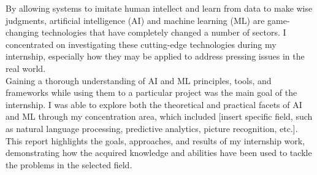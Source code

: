 By allowing systems to imitate human intellect and learn from data to make wise judgments, artificial intelligence (AI) and machine learning (ML) are game-changing technologies that have completely changed a number of sectors. I concentrated on investigating these cutting-edge technologies during my internship, especially how they may be applied to address pressing issues in the real world.\\
Gaining a thorough understanding of AI and ML principles, tools, and frameworks while using them to a particular project was the main goal of the internship. I was able to explore both the theoretical and practical facets of AI and ML through my concentration area, which included [insert specific field, such as natural language processing, predictive analytics, picture recognition, etc.].
This report highlights the goals, approaches, and results of my internship work, demonstrating how the acquired knowledge and abilities have been used to tackle the problems in the selected field.

